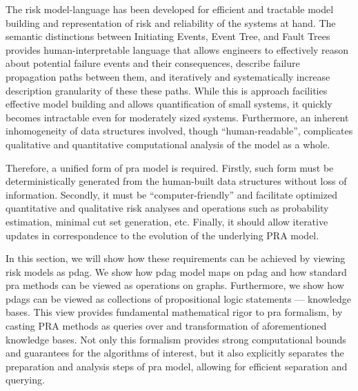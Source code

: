 


The risk model-language has been developed for efficient and tractable model building and representation of risk and reliability of the systems at hand.
The semantic distinctions between Initiating Events, Event Tree, and Fault Trees provides human-interpretable language that allows engineers to effectively reason about potential failure events and their consequences, describe failure propagation paths between them, and iteratively and systematically increase description granularity of these these paths.
While this is approach facilities effective model building and allows quantification of small systems, it quickly becomes intractable even for moderately sized systems. 
Furthermore, an inherent inhomogeneity of data structures involved, though ``human-readable'', complicates qualitative and quantitative computational analysis of the model as a whole. 

Therefore, a unified form of \acrshort{pra} model is required. 
Firstly, such form must be deterministically generated from the human-built data structures without loss of information.
Secondly, it must be ``computer-friendly'' and facilitate optimized quantitative and qualitative risk analyses and operations such as probability estimation, minimal cut set generation, etc.
Finally, it should allow iterative updates in correspondence to the evolution of the underlying PRA model.

In this section, we will show how these requirements can be achieved by viewing risk models as \acrfull{pdag}. We show how \acrshort{pdag} model maps on \acrshort{pdag} and how standard \acrshort{pra} methods can be viewed as operations on graphs. 
Furthermore, we show how \acrshort{pdag}s can be viewed as collections of propositional logic statements --- knowledge bases.
This view provides fundamental mathematical rigor to \acrshort{pra} formalism, by casting PRA methods as queries over and transformation of aforementioned knowledge bases.
Not only this formalism provides strong computational bounds and guarantees for the algorithms of interest, but it also explicitly separates the preparation and analysis steps of \acrshort{pra} model, allowing for efficient separation and querying.

